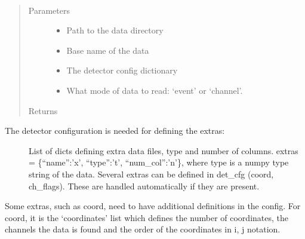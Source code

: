 \documentclass[letterpaper,10pt,english]{sphinxmanual}
\begin{document}
\begin{fulllineitems}
\label{\detokenize{autodocs/data:listmode.data.read_binary_data}}~\begin{quote}\begin{description}
\item[{Parameters}] \leavevmode\begin{itemize}
\item {} 
\sphinxAtStartPar
{} \textendash{} Path to the data directory

\item {} 
\sphinxAtStartPar
{} \textendash{} Base name of the data

\item {} 
\sphinxAtStartPar
{} \textendash{} The detector config dictionary

\item {} 
\sphinxAtStartPar
{} \textendash{} What mode of data to read: ‘event’ or ‘channel’.

\end{itemize}

\item[{Returns}] \leavevmode
\sphinxAtStartPar


\end{description}\end{quote}
\begin{description}
\item[{The detector configuration is needed for defining the extras:}] \leavevmode
\sphinxAtStartPar
List of dicts defining extra data files, type and number of
columns. extras = \{“name”:’x’, “type”:’t’, “num\_col”:’n’\}, where type
is a numpy type string of the data. Several extras can be defined in
det\_cfg (coord, ch\_flags). These are handled automatically if they are
present.

\end{description}

\sphinxAtStartPar
Some extras, such as coord, need to have additional definitions in the
config. For coord, it is the ‘coordinates’ list which defines the number
of coordinates, the channels the data is found and the order of the
coordinates in i, j notation.

\end{fulllineitems}
\end{document}
